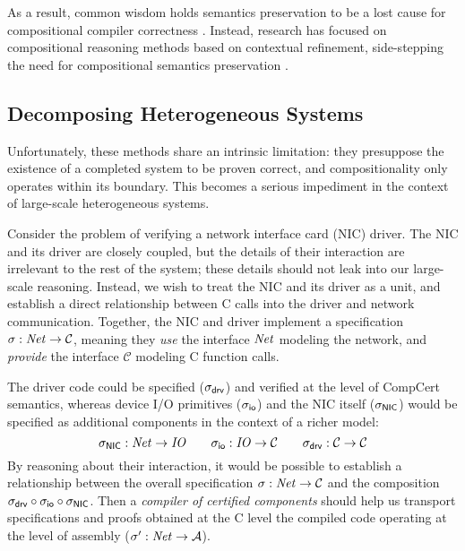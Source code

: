 As a result, common wisdom holds semantics preservation to be a lost
cause for compositional compiler correctness \cite{next700}.  Instead,
research has focused on compositional reasoning methods based on
contextual refinement, side-stepping the need for compositional
semantics preservation \cite{sepcompcert,compcertm}.

\subsection{Decomposing Heterogeneous Systems}
\label{ssec:intro-dhs}

Unfortunately, these methods share an intrinsic limitation: they
presuppose the existence of a completed system to be proven correct,
and compositionality only operates within its boundary.  This becomes
a serious impediment in the context of large-scale heterogeneous
systems.

\begin{example} \label{ex:nicdriver} 
Consider the problem of verifying a network interface card (NIC)
driver.  The NIC and its driver are closely coupled, but the details
of their interaction are irrelevant to the rest of the system; these
details should not leak into our large-scale reasoning.  Instead, we
wish to treat the NIC and its driver as a unit, and establish a direct
relationship between C calls into the driver and network
communication.  Together, the NIC and driver implement a specification
$\sigma : \mathit{Net} \rightarrow \mathcal{C}$, meaning they \emph{use}
the interface $\mathit{Net}$ modeling the network, and \emph{provide} the
interface $\mathcal{C}$ modeling C function calls.

The driver code could be specified ($\sigma_{ \mathsf{drv} }$) and verified at
the level of CompCert semantics, whereas device I/O primitives
($\sigma_{ \mathsf{io} }$) and the NIC itself ($\sigma_{ \mathsf{NIC} }$) would be
specified as additional components in the context of a richer model:
\[
  \sigma_{ \mathsf{NIC} } : \mathit{Net} \rightarrow \mathit{IO}
  \qquad
  \sigma_{ \mathsf{io} } : \mathit{IO} \rightarrow \mathcal{C}
  \qquad
  \sigma_{ \mathsf{drv} } : \mathcal{C} \rightarrow \mathcal{C}
\]
By reasoning about their interaction, it would be possible to
establish a relationship between the overall specification $\sigma :
\mathit{Net} \rightarrow \mathcal{C}$ and the composition $\sigma_{ \mathsf{drv} }
\circ \sigma_{ \mathsf{io} } \circ \sigma_{ \mathsf{NIC} }$.  Then a \emph{compiler of
certified components} should help us transport specifications and
proofs obtained at the C level %
the compiled code operating at the level of assembly ($\sigma' :
\mathit{Net} \rightarrow \mathcal{A}$).
\end{example}

